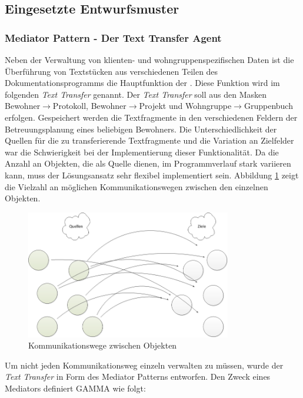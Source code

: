 \newpage

\subsection{Eingesetzte Entwurfsmuster}
\subsubsection{Mediator Pattern - Der Text Transfer Agent}
Neben der Verwaltung von klienten- und wohngruppenspezifischen Daten ist die Überführung von Textstücken aus verschiedenen Teilen des
Dokumentationsprogramms die Hauptfunktion der \EBP. Diese Funktion wird im folgenden \textit{Text Transfer} genannt. \newline
Der \textit{Text Transfer} soll aus den Masken Bewohner$\rightarrow$Protokoll, Bewohner$\rightarrow$Projekt und Wohngruppe$\rightarrow$Gruppenbuch
erfolgen. Gespeichert werden die Textfragmente in den verschiedenen Feldern der Betreuungsplanung eines beliebigen Bewohners. Die Unterschiedlichkeit
der Quellen für die zu transferierende Textfragmente und die Variation an Zielfelder war die Schwierigkeit bei der Implementierung dieser
Funktionalität. Da die Anzahl an Objekten, die als Quelle dienen, im Programmverlauf stark variieren kann, muss der Lösungsansatz sehr flexibel
implementiert sein. Abbildung \ref{unstrukturiert} zeigt die Vielzahl an möglichen Kommunikationswegen zwischen den einzelnen Objekten.\\
\begin{figure}[htp!]
	\includegraphics[width=0.8\textwidth]{unmediated}
	\caption{Kommunikationswege zwischen Objekten}
	\label{unstrukturiert}
\end{figure}
Um nicht jeden Kommunikationsweg einzeln verwalten zu müssen, wurde der \textit{Text Transfer} in Form des Mediator Patterns entworfen. Den Zweck
eines Mediators definiert GAMMA wie folgt: \\
